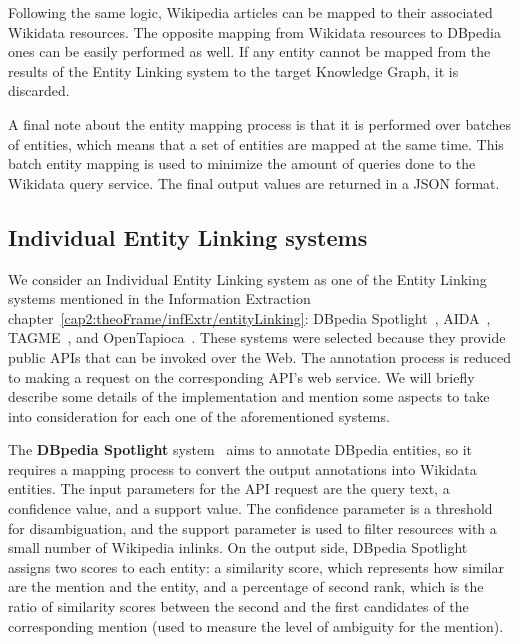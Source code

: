 Following the same logic, Wikipedia articles can be mapped to their associated Wikidata resources. 
The opposite mapping from Wikidata resources to DBpedia ones can be easily performed as well. 
If any entity cannot be mapped from the results of the Entity Linking system to the target 
Knowledge Graph, it is discarded.

A final note about the entity mapping process is that it is performed over batches of entities, 
which means that a set of entities are mapped at the same time. This batch entity mapping is 
used to minimize the amount of queries done to the Wikidata query service. The final output 
values are returned in a JSON format.

\subsection{Individual Entity Linking systems}
\label{cap3:system/entLinModule/individualSystems}
We consider an Individual Entity Linking system as one of the Entity Linking systems mentioned 
in the Information Extraction chapter~\ref{cap2:theoFrame/infExtr/entityLinking}: 
DBpedia Spotlight~\cite{EL:dbpedia-spotlight-MendesJGB11}, 
AIDA~\cite{EL:aida-tool-YosefHBSW11, EL:aida-HoffartYBFPSTTW11}, TAGME~\cite{EL:tagme-FerraginaS10}, 
and OpenTapioca~\cite{EL:opentapioca-Delpeuch19}. These systems were selected because they 
provide public APIs that can be invoked over the Web. The annotation process is reduced to 
making a request on the corresponding API’s web service. We will briefly describe some details 
of the implementation and mention some aspects to take into consideration for each one of the 
aforementioned systems.

The \textbf{DBpedia Spotlight} system~\cite{EL:dbpedia-spotlight-MendesJGB11} aims to 
annotate DBpedia entities, so it requires a mapping process to convert the output annotations 
into Wikidata entities. The input parameters for the API request are the query text, a 
confidence value, and a support value. The confidence parameter is a threshold for disambiguation, 
and the support parameter is used to filter resources with a small number of Wikipedia 
inlinks. On the output side, DBpedia Spotlight assigns two scores to each entity: a 
similarity score, which represents how similar are the mention and the entity, and a 
percentage of second rank, which is the ratio of similarity scores between the second and the 
first candidates of the corresponding mention (used to measure the level of ambiguity for the 
mention).

